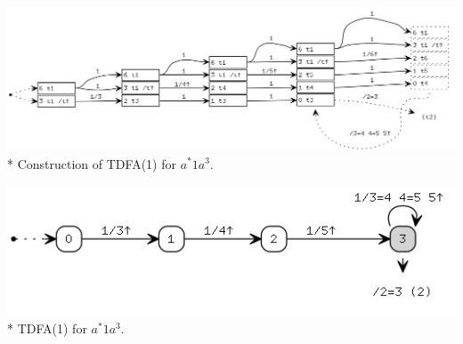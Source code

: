 \documentclass{article}
\theoremstyle{definition}
\begin{document}
\begin{multicols}{2}
\begin{center}
\end{center}
\begin{center}
\includegraphics[width=\linewidth]{img/example3/tdfa1_raw.png}\\*
\footnotesize{Construction of TDFA(1) for $a^* 1 a^{3}$.} \\
\end{center}
\begin{center}
\includegraphics[width=0.8\linewidth]{img/example3/tdfa1.png}\\*
\footnotesize{TDFA(1) for $a^* 1 a^{3}$.} \\
\end{center}


\end{multicols}
\end{document}
